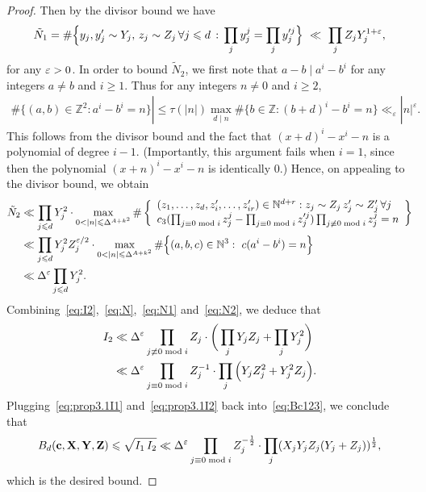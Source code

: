 \begin{proof}
Then by the divisor bound we have
\begin{align}\label{eq:N1}
\tilde{N}_1= \#\Big\{ y_j, y_j'\sim Y_j,\,z_j \sim Z_j\,\forall j\leqslant d\,:\, \prod_{j}y_j^j=\prod_{j}y_j'^j\Big\} \ \ll \ \prod_j Z_j Y_j^{1+\varepsilon},
\end{align}
for any $\varepsilon>0$. In order to bound $\tilde{N}_2$, we first note that $a-b\mid a^i-b^i$ for any integers $a\neq b$ and $i\geq 1$. Thus for any integers $n\neq 0$ and $i\geq 2$,
\begin{align*}
\#\{(a,b)\in \mathbb{Z}^2:a^i-b^i=n\}|\leq \tau(|n|)\max_{d\mid n}\#\{b\in \mathbb{Z}:(b+d)^i-b^i=n\}\ll_{\varepsilon} |n|^{\varepsilon}.
\end{align*}
This follows from the divisor bound and the fact that $(x+d)^i-x^i-n$ is a polynomial of degree $i-1$. (Importantly, this argument fails when $i=1$, since then the polynomial $(x+n)^i-x^i-n$ is identically $0$.)
Hence, on appealing to the divisor bound, we obtain
\begin{align}\label{eq:N2}\begin{split}
\tilde{N}_2&\ll \prod_{j\leq d}Y_j^2\cdot \max_{0<|n|\leq \Delta^{A+k^2}}\#\left\{
\begin{array}{l}
(z_1,\ldots,z_d,z_i',\ldots, z_{ir}')\in \mathbb{N}^{d+r}:
z_j \sim Z_j\,z_j' \sim Z_j'\, \forall j\\
c_3(\prod_{j\equiv 0\bmod i}z_j^j-\prod_{j\equiv 0\bmod i}z_j'^j)\prod_{j\not \equiv 0\bmod i}z_{j}^j=n
\end{array}\right\}\\
&\ll \prod_{j\leq d}Y_j^2Z_j^{\eps/2}\cdot \max_{0<|n|\leq \Delta^{A+k^2}}\#\Big\{(a,b,c)\in \mathbb{N}^{3}:\,\, c(a^i-b^i)=n \Big\}\\
&\ll \Delta^\eps\prod_{j\leq d}Y_j^{2}.
\end{split}
\end{align}
Combining~\eqref{eq:I2},~\eqref{eq:N},~\eqref{eq:N1} and~\eqref{eq:N2}, we deduce that
\begin{equation}
\begin{split}
\label{eq:prop3.1I2}
I_2 &\ll \Delta^\varepsilon \prod_{j\not \equiv 0\bmod i}Z_{j} \cdot\bigg(\prod_j Y_j Z_j + \prod_{j}
Y_j^2 \bigg) \\
&\ll \Delta^\varepsilon \prod_{j\equiv 0\bmod i}Z_j^{-1}\cdot \prod_{j}\Big(Y_j Z_j^{2} + Y_j^2Z_j\Big).
\end{split}\end{equation}
Plugging~\eqref{eq:prop3.1I1} and~\eqref{eq:prop3.1I2} back into~\eqref{eq:Bc123}, we conclude that
\begin{align*}
B_d(\mathbf{c},\mathbf{X},\mathbf{Y},\mathbf{Z}) \leqslant \sqrt{I_1\,I_2}\ll \Delta^\varepsilon \prod_{j\equiv 0\bmod i}Z_j^{-\frac{1}{2}}\cdot \prod_{j}(X_j Y_j Z_j(Y_j+Z_j))^{\frac{1}{2}},
\end{align*}
which is the desired bound.
\end{proof}


